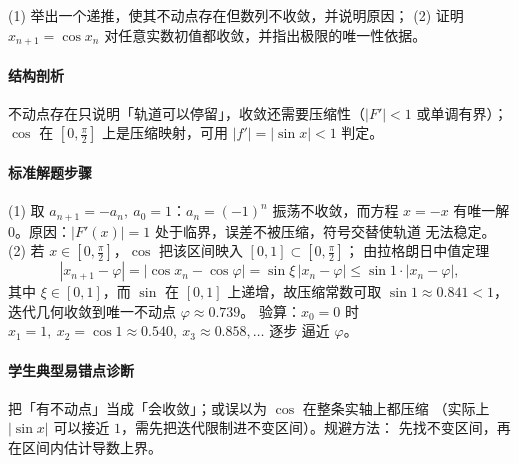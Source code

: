 \begin{problem}
(1) 举出一个递推，使其不动点存在但数列不收敛，并说明原因；
(2) 证明 $x_{n+1}=\cos x_n$ 对任意实数初值都收敛，并指出极限的唯一性依据。
\end{problem}
\begin{solution}
\paragraph{结构剖析}
不动点存在只说明「轨道可以停留」，收敛还需要压缩性（$|F'|<1$ 或单调有界）；
$\cos$ 在 $[0,\frac\pi2]$ 上是压缩映射，可用 $|f'|=|\sin x|<1$ 判定。
\paragraph{标准解题步骤}
(1) 取 $a_{n+1}=-a_n,\ a_0=1$：$a_n=(-1)^n$ 振荡不收敛，而方程 $x=-x$
有唯一解 $0$。原因：$|F'(x)|=1$ 处于临界，误差不被压缩，符号交替使轨道
无法稳定。
(2) 若 $x\in[0,\frac\pi2]$，$\cos$ 把该区间映入 $[0,1]\subset[0,\frac\pi2]$；
由拉格朗日中值定理
\[
  |x_{n+1}-\varphi|=|\cos x_n-\cos\varphi|
  =\sin\xi\,|x_n-\varphi|\le\sin1\cdot|x_n-\varphi|,
\]
其中 $\xi\in[0,1]$，而 $\sin$ 在 $[0,1]$ 上递增，故压缩常数可取
$\sin1\approx0.841<1$，迭代几何收敛到唯一不动点 $\varphi\approx0.739$。
验算：$x_0=0$ 时 $x_1=1,\ x_2=\cos1\approx0.540,\ x_3\approx0.858,\dots$ 逐步
逼近 $\varphi$。
\paragraph{学生典型易错点诊断}
把「有不动点」当成「会收敛」；或误以为 $\cos$ 在整条实轴上都压缩
（实际上 $|\sin x|$ 可以接近 $1$，需先把迭代限制进不变区间）。规避方法：
先找不变区间，再在区间内估计导数上界。
\end{solution}

